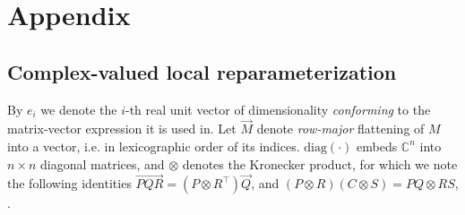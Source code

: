 \documentclass[a4paper,10pt]{article}
\newcommand{\cplx}{\mathbb{C}}
\renewcommand{\vec}[1]{\overrightarrow{#1}}
\newcommand{\diag}[1]{\mathrm{diag}{#1}}
\begin{document}

\clearpage




\clearpage

\section{Appendix} %
\label{sec:appendix}

\subsection{Complex-valued local reparameterization} %
\label{sub:complex_valued_local_reparameterization}

By $e_i$ we denote the $i$-th real unit vector of dimensionality \textit{conforming} to the
matrix-vector expression it is used in. Let $\vec{M}$ denote \textit{row-major} flattening
of $M$ into a vector, i.e. in lexicographic order of its indices. $\diag{(\cdot)}$ embeds
$\cplx^n$ into $n\times n$ diagonal matrices, and $\otimes$ denotes the Kronecker product,
for which we note the following identities $
  \vec{P Q R} = (P \otimes R^\top) \vec{Q}
$, and $
  (P \otimes R) (C \otimes S) = P Q \otimes R S
$, \citep{petersen_matrix_2012}.
\end{document}
